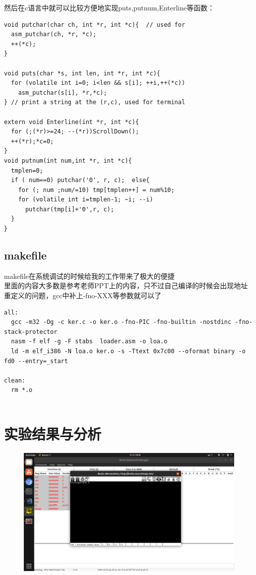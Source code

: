 \documentclass[a4paper,11pt,UTF8]{ctexart}
\newcommand{\bottomcaption}{%
\setlength{\abovecaptionskip}{6pt}%
\setlength{\belowcaptionskip}{6pt}%
\caption}
\newcommand{\xiaowuhao}{\fontsize{9pt}{\baselineskip}\selectfont}   %
\begin{document}
      然后在c语言中就可以比较方便地实现puts,putnum,Enterline等函数：
      \begin{lstlisting}[caption={stdio.h},captionpos=b]
void putchar(char ch, int *r, int *c){  // used for
  asm_putchar(ch, *r, *c);
  ++(*c);
}

void puts(char *s, int len, int *r, int *c){
  for (volatile int i=0; i<len && s[i]; ++i,++(*c))
    asm_putchar(s[i], *r,*c);
} // print a string at the (r,c), used for terminal 

extern void Enterline(int *r, int *c){
  for (;(*r)>=24; --(*r))ScrollDown();
  ++(*r);*c=0;
}
void putnum(int num,int *r, int *c){
  tmplen=0;
  if ( num==0) putchar('0', r, c);	else{
    for (; num ;num/=10) tmp[tmplen++] = num%10;
    for (volatile int i=tmplen-1; ~i; --i)
      putchar(tmp[i]+'0',r, c);
  }
}
      \end{lstlisting}
      \subsection{makefile}
      makefile在系统调试的时候给我的工作带来了极大的便捷\\
      里面的内容大多数是参考老师PPT上的内容，只不过自己编译的时候会出现地址重定义的问题，gcc中补上-fno-XXX等参数就可以了
      \begin{lstlisting}[caption={makefile},captionpos=b]
all:
  gcc -m32 -Og -c ker.c -o ker.o -fno-PIC -fno-builtin -nostdinc -fno-stack-protector
  nasm -f elf -g -F stabs  loader.asm -o loa.o
  ld -m elf_i386 -N loa.o ker.o -s -Ttext 0x7c00 --oformat binary -o fd0 --entry=_start

clean:
  rm *.o
        
      \end{lstlisting}      

\section{实验结果与分析}

\begin{figure}[!htbp]
  \centering
  \includegraphics[width=\textwidth]{imgs/Screenshot_from_2019-03-29_21-09-42.png}
  \bottomcaption{\xiaowuhao{打开程序显示终端}}
  \end{figure}
  
\end{document}
